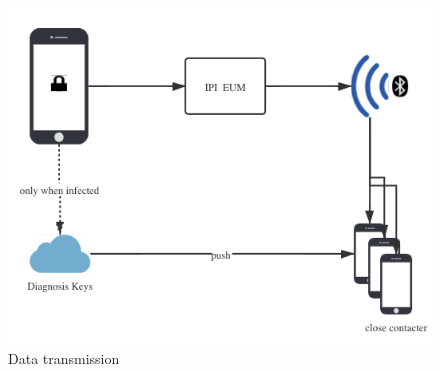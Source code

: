 \documentclass{beamer}
\begin{document}
\begin{frame}[allowframebreaks]
\begin{figure}[]
  \centering
  \includegraphics[height=0.6\textwidth]{figure/judge}
  \caption{Data transmission}
\end{figure}
\end{frame}
\end{document}
